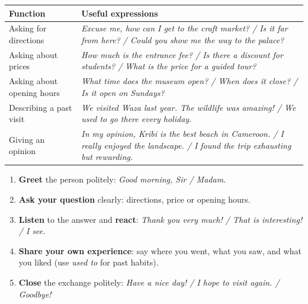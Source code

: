 \documentclass[11pt]{article}
\begin{document}
\begin{center}
\begin{tabularx}{\linewidth}{|l|X|}\hline
\rowcolor{popblueL} \textbf{Function} & \textbf{Useful expressions} \\ \hline
Asking for directions & \emph{Excuse me, how can I get to the craft market? / Is it far from here? / Could you show me the way to the palace?} \\ \hline
Asking about prices & \emph{How much is the entrance fee? / Is there a discount for students? / What is the price for a guided tour?} \\ \hline
Asking about opening hours & \emph{What time does the museum open? / When does it close? / Is it open on Sundays?} \\ \hline
Describing a past visit & \emph{We visited Waza last year. The wildlife was amazing! / We used to go there every holiday.} \\ \hline
Giving an opinion & \emph{In my opinion, Kribi is the best beach in Cameroon. / I really enjoyed the landscape. / I found the trip exhausting but rewarding.} \\ \hline
\end{tabularx}
\end{center}

\begin{methode}
\begin{enumerate}
\item \textbf{Greet} the person politely: \emph{Good morning, Sir / Madam.}
\item \textbf{Ask your question} clearly: directions, price or opening hours.
\item \textbf{Listen} to the answer and \textbf{react}: \emph{Thank you very much! / That is interesting! / I see.}
\item \textbf{Share your own experience}: say where you went, what you saw, and what you liked (use \emph{used to} for past habits).
\item \textbf{Close} the exchange politely: \emph{Have a nice day! / I hope to visit again. / Goodbye!}
\end{enumerate}
\end{methode}
\end{document}
